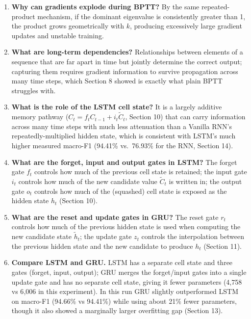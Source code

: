 \documentclass[10pt]{article}
\begin{document}
\begin{enumerate}
\item \textbf{Why can gradients explode during BPTT?}
By the same repeated-product mechanism, if the dominant eigenvalue is
consistently greater than 1, the product grows geometrically with $k$,
producing excessively large gradient updates and unstable training.

\item \textbf{What are long-term dependencies?}
Relationships between elements of a sequence that are far apart in time but
jointly determine the correct output; capturing them requires gradient
information to survive propagation across many time steps, which Section 8
showed is exactly what plain BPTT struggles with.

\item \textbf{What is the role of the LSTM cell state?}
It is a largely additive memory pathway ($C_t=f_tC_{t-1}+i_t\tilde{C}_t$,
Section 10) that can carry information across many time steps with much
less attenuation than a Vanilla RNN's repeatedly-multiplied hidden state,
which is consistent with LSTM's much higher measured macro-F1 (94.41\%
vs.\ 76.93\% for the RNN, Section 14).

\item \textbf{What are the forget, input and output gates in LSTM?}
The forget gate $f_t$ controls how much of the previous cell state is
retained; the input gate $i_t$ controls how much of the new candidate
value $\tilde{C}_t$ is written in; the output gate $o_t$ controls how much
of the (squashed) cell state is exposed as the hidden state $h_t$ (Section
10).

\item \textbf{What are the reset and update gates in GRU?}
The reset gate $r_t$ controls how much of the previous hidden state is used
when computing the new candidate state $\tilde{h}_t$; the update gate $z_t$
controls the interpolation between the previous hidden state and the new
candidate to produce $h_t$ (Section 11).

\item \textbf{Compare LSTM and GRU.}
LSTM has a separate cell state and three gates (forget, input, output); GRU
merges the forget/input gates into a single update gate and has no separate
cell state, giving it fewer parameters (4{,}758 vs 6{,}006 in this
experiment). In this run GRU slightly outperformed LSTM on macro-F1
(94.66\% vs 94.41\%) while using about 21\% fewer parameters, though it
also showed a marginally larger overfitting gap (Section 13).


\end{enumerate}
\end{document}
